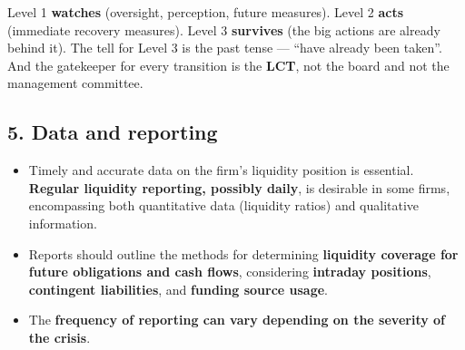 \begin{lrtrapbox}
Level 1 \textbf{watches} (oversight, perception, future measures). Level 2 \textbf{acts} (immediate recovery measures). Level 3 \textbf{survives} (the big actions are already behind it). The tell for Level 3 is the past tense --- ``have already been taken''. And the gatekeeper for every transition is the \textbf{LCT}, not the board and not the management committee.
\end{lrtrapbox}

\subsection{5. Data and reporting}

\begin{itemize}
\item Timely and accurate data on the firm's liquidity position is essential. \textbf{Regular liquidity reporting, possibly daily}, is desirable in some firms, encompassing both quantitative data (liquidity ratios) and qualitative information.
\item Reports should outline the methods for determining \textbf{liquidity coverage for future obligations and cash flows}, considering \textbf{intraday positions}, \textbf{contingent liabilities}, and \textbf{funding source usage}.
\item The \textbf{frequency of reporting can vary depending on the severity of the crisis}.
\end{itemize}

